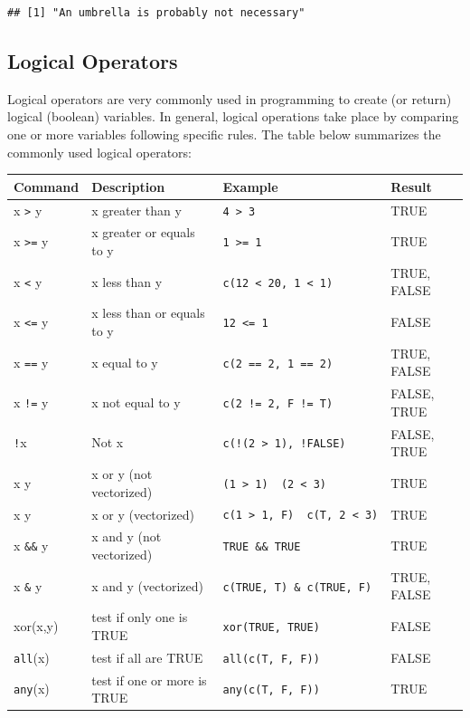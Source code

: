 \documentclass[12pt,]{krantz}
\begin{document}
\begin{verbatim}
## [1] "An umbrella is probably not necessary"
\end{verbatim}

\subsection{Logical Operators}\label{sec_logical}

Logical operators are very commonly used in programming to create (or
return) logical (boolean) variables. In general, logical operations take
place by comparing one or more variables following specific rules. The
table below summarizes the commonly used logical operators:

\begin{longtable}[]{@{}llll@{}}
\toprule
Command & Description & Example & Result\tabularnewline
\midrule
\endhead
x \texttt{\textgreater{}} y & x greater than y &
\texttt{4\ \textgreater{}\ 3} & TRUE\tabularnewline
x \texttt{\textgreater{}=} y & x greater or equals to y &
\texttt{1\ \textgreater{}=\ 1} & TRUE\tabularnewline
x \texttt{\textless{}} y & x less than y &
\texttt{c(12\ \textless{}\ 20,\ 1\ \textless{}\ 1)} & TRUE,
FALSE\tabularnewline
x \texttt{\textless{}=} y & x less than or equals to y &
\texttt{12\ \textless{}=\ 1} & FALSE\tabularnewline
x \texttt{==} y & x equal to y & \texttt{c(2\ ==\ 2,\ 1\ ==\ 2)} & TRUE,
FALSE\tabularnewline
x \texttt{!=} y & x not equal to y & \texttt{c(2\ !=\ 2,\ F\ !=\ T)} &
FALSE, TRUE\tabularnewline
\texttt{!}x & Not x & \texttt{c(!(2\ \textgreater{}\ 1),\ !FALSE)} &
FALSE, TRUE\tabularnewline
x \texttt{\textbar{}\textbar{}}y & x or y (not vectorized) &
\texttt{(1\ \textgreater{}\ 1)\ \textbar{}\textbar{}\ (2\ \textless{}\ 3)}
& TRUE\tabularnewline
x \texttt{\textbar{}}y & x or y (vectorized) &
\texttt{c(1\ \textgreater{}\ 1,\ F)\ \textbar{}\textbar{}\ c(T,\ 2\ \textless{}\ 3)}
& TRUE\tabularnewline
x \texttt{\&\&} y & x and y (not vectorized) & \texttt{TRUE\ \&\&\ TRUE}
& TRUE\tabularnewline
x \texttt{\&} y & x and y (vectorized) &
\texttt{c(TRUE,\ T)\ \&\ c(TRUE,\ F)} & TRUE, FALSE\tabularnewline
xor(x,y) & test if only one is TRUE & \texttt{xor(TRUE,\ TRUE)} &
FALSE\tabularnewline
\texttt{all}(x) & test if all are TRUE & \texttt{all(c(T,\ F,\ F))} &
FALSE\tabularnewline
\texttt{any}(x) & test if one or more is TRUE &
\texttt{any(c(T,\ F,\ F))} & TRUE\tabularnewline
\bottomrule
\end{longtable}
\end{document}
